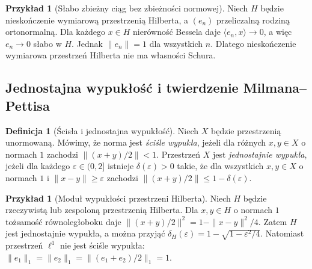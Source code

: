 \documentclass[11pt,a4paper]{article}
\numberwithin{equation}{section}
\theoremstyle{plain}
\theoremstyle{definition}
\newtheorem{definicja}[twierdzenie]{Definicja}
\newtheorem{przyklad}[twierdzenie]{Przykład}
\theoremstyle{remark}
\begin{document}
\begin{przyklad}[Słabo zbieżny ciąg bez zbieżności normowej]
\label{ex:en-hilbert26}
Niech $H$ będzie nieskończenie wymiarową przestrzenią Hilberta,
a $(e_n)$ przeliczalną rodziną ortonormalną.
Dla każdego $x\in H$ nierówność Bessela daje
$\langle e_n,x\rangle\to0$, a więc $e_n\to0$ słabo
w $H$. Jednak $\|e_n\|=1$ dla wszystkich $n$.
Dlatego nieskończenie wymiarowa przestrzeń Hilberta
nie ma własności Schura.
\end{przyklad}

\subsection{Jednostajna wypukłość i twierdzenie Milmana--Pettisa}

\begin{definicja}[Ścisła i jednostajna wypukłość]
\label{def:uniform-convex26}
Niech $X$ będzie przestrzenią unormowaną.
Mówimy, że norma jest \emph{ściśle wypukła}, jeżeli
dla różnych $x,y\in X$ o normach $1$ zachodzi
$\|(x+y)/2\|<1$.
Przestrzeń $X$ jest \emph{jednostajnie wypukła}, jeżeli
dla każdego $\varepsilon\in(0,2]$ istnieje
$\delta(\varepsilon)>0$ takie, że dla wszystkich
$x,y\in X$ o normach $1$ i $\|x-y\|\ge\varepsilon$
zachodzi $\|(x+y)/2\|\le1-\delta(\varepsilon)$.
\end{definicja}

\begin{przyklad}[Moduł wypukłości przestrzeni Hilberta]
\label{ex:modulus-hilbert26}
Niech $H$ będzie rzeczywistą lub zespoloną przestrzenią
Hilberta. Dla $x,y\in H$ o normach $1$ tożsamość
równoległoboku daje
$\|(x+y)/2\|^2=1-\|x-y\|^2/4$.
Zatem $H$ jest jednostajnie wypukła, a można przyjąć
$\delta_H(\varepsilon)=1-\sqrt{1-\varepsilon^2/4}$.
Natomiast przestrzeń $\ell^1$ nie jest ściśle wypukła:
$\|e_1\|_1=\|e_2\|_1=\|(e_1+e_2)/2\|_1=1$.
\end{przyklad}
\end{document}

